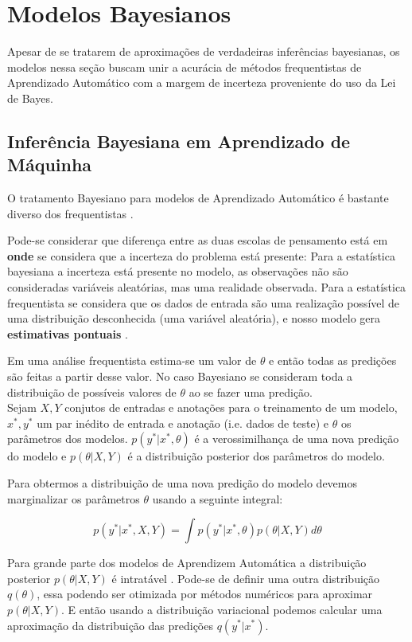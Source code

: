 \section{Modelos Bayesianos}

Apesar de se tratarem de aproximações de verdadeiras inferências bayesianas, os
modelos nessa seção buscam unir a acurácia de métodos frequentistas de
Aprendizado Automático com a
margem de incerteza proveniente do uso da Lei de Bayes.

\subsection{Inferência Bayesiana em Aprendizado de Máquinha}
\label{sec:bayesinf}
O tratamento Bayesiano para modelos de Aprendizado Automático é bastante diverso dos frequentistas \citep{dlbook}.

Pode-se considerar que diferença entre as duas escolas de pensamento está em
\textbf{onde} se considera que a incerteza do problema está presente: Para a
estatística bayesiana a incerteza está presente no modelo, as observações não
são consideradas variáveis aleatórias, mas uma realidade observada. Para a estatística frequentista
se considera que os dados de entrada são uma realização possível de uma
distribuição desconhecida (uma variável aleatória), e nosso modelo gera \textbf{estimativas pontuais} \citep{rethink}.

Em uma análise frequentista estima-se um valor de $\theta$ e então todas as
predições são feitas a partir desse valor. No caso Bayesiano se consideram toda
a distribuição de possíveis valores de $\theta$ ao se fazer uma predição. \\ 


Sejam $X,Y$ conjutos de entradas e anotações para o treinamento de um modelo,
$x^*,y^*$ um par inédito de entrada e anotação (i.e. dados de teste) e
$\theta$ os parâmetros dos modelos. $p(y^* | x^*,\theta)$ é a verossimilhança de
uma nova predição do modelo e $p(\theta | X,Y)$ é a distribuição posterior dos
parâmetros do modelo.

Para obtermos a distribuição de uma nova
predição do modelo devemos marginalizar os parâmetros $\theta$ usando a seguinte integral:

\begin{equation}
  \label{eq:int}
  p(y^* | x^* , X,Y) = \int  p(y^* | x^*,\theta) p(\theta | X,Y)  d\theta 
\end{equation}

Para grande parte dos modelos de Aprendizem Automática a distribuição posterior
$p(\theta | X,Y)$ é intratável \citep{ubertime}. Pode-se de definir uma outra
distribuição $q(\theta)$, essa podendo ser otimizada por métodos numéricos para
aproximar $p(\theta | X,Y)$. E então usando a distribuição variacional podemos
calcular uma aproximação da distribuição das predições $q(y^*|x^*)$. 

